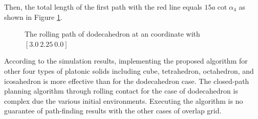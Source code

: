 \noindent Then, the total length of the first path with the red line equals $15a\cot{\alpha_4}$ as shown in Figure \ref{fig:dodecaPath}.\\

\begin{center}
\begin{figure}[h]
\hfill
{}
\caption{The rolling path of dodecahedron at an coordinate with $[3.0\ 2.25\ 0.0]$}
\label{fig:dodecaPath}
\end{figure}
\end{center}

\noindent According to the simulation results, implementing the proposed algorithm for other four types of platonic solids including cube, tetrahedron, octahedron, and icosahedron is more effective than for the dodecahedron case. 
%
The closed-path planning algorithm through rolling contact for the case of dodecahedron is complex due the various initial environments. 
%
Executing the algorithm is no guarantee of path-finding results with the other cases of overlap grid.
